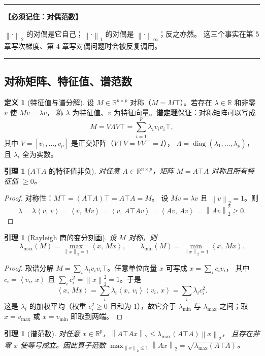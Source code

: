 \documentclass[11pt,a4paper,UTF8]{ctexart}
\theoremstyle{plain}
\newtheorem{lemma}[theorem]{引理}
\theoremstyle{definition}
\newtheorem{definition}[theorem]{定义}
\theoremstyle{remark}
\newcommand{\R}{\mathbb{R}}
\newcommand{\norm}[1]{\left\lVert #1 \right\rVert}
\newcommand{\inner}[2]{\left\langle #1,\, #2 \right\rangle}
\newcommand{\diag}{\operatorname{diag}}
\newenvironment{keypoint}[1]
  {\par\medskip\noindent\begin{minipage}{\linewidth}%
   \hrule\smallskip\noindent\textbf{【必须记住：#1】}\par\nopagebreak\smallskip}
  {\smallskip\hrule\end{minipage}\medskip}
\begin{document}
\begin{keypoint}{对偶范数}
$\norm{\cdot}_2$ 的对偶是它自己；$\norm{\cdot}_1$ 的对偶是 $\norm{\cdot}_\infty$；反之亦然。
这三个事实在第 5 章写次梯度、第 4 章写对偶问题时会被反复调用。
\end{keypoint}

\subsection{对称矩阵、特征值、谱范数}

\begin{definition}[特征值与谱分解]
设 $M\in\R^{p\times p}$ 对称（$M=M\top$）。若存在 $\lambda\in\R$ 和非零 $v$ 使 $Mv=\lambda v$，
称 $\lambda$ 为特征值、$v$ 为特征向量。\textbf{谱定理}保证：对称矩阵可以写成
\[
M=V\Lambda V\top=\sum_{i=1}^p\lambda_i v_iv_i\top,
\]
其中 $V=[v_1,\dots,v_p]$ 是正交矩阵（$V\top V=VV\top=I$），
$\Lambda=\diag(\lambda_1,\dots,\lambda_p)$，且 $\lambda_i$ 全为实数。
\end{definition}

\begin{lemma}[$A\top A$ 的特征值非负]\label{lem:psd}
对任意 $A\in\R^{n\times p}$，矩阵 $M=A\top A$ 对称且所有特征值 $\ge0$。
\end{lemma}

\begin{proof}
对称性：$M\top=(A\top A)\top=A\top A=M$。
设 $Mv=\lambda v$ 且 $\norm{v}_2=1$。则
\[
\lambda=\lambda\inner{v}{v}=\inner{v}{Mv}=\inner{v}{A\top Av}=\inner{Av}{Av}=\norm{Av}_2^2\ge0 .
\]
\end{proof}

\begin{lemma}[Rayleigh 商的变分刻画]\label{lem:rayleigh}
设 $M$ 对称，则
\[
\lambda_{\max}(M)=\max_{\norm{x}_2=1}\inner{x}{Mx},\qquad
\lambda_{\min}(M)=\min_{\norm{x}_2=1}\inner{x}{Mx}.
\]
\end{lemma}

\begin{proof}
取谱分解 $M=\sum_i\lambda_iv_iv_i\top$。任意单位向量 $x$ 可写成 $x=\sum_i c_iv_i$，
其中 $c_i=\inner{v_i}{x}$ 且 $\sum_ic_i^2=\norm{x}_2^2=1$。于是
\[
\inner{x}{Mx}=\sum_i\lambda_i\inner{x}{v_i}\inner{v_i}{x}=\sum_i\lambda_ic_i^2 .
\]
这是 $\lambda_i$ 的加权平均（权重 $c_i^2\ge0$ 且和为 $1$），故它介于 $\lambda_{\min}$ 与
$\lambda_{\max}$ 之间；取 $x=v_{\max}$ 或 $x=v_{\min}$ 即取到两端。
\end{proof}

\begin{lemma}[谱范数]\label{lem:specnorm}
对任意 $x\in\R^p$，$\norm{A\top Ax}_2\le\lambda_{\max}(A\top A)\norm{x}_2$，
且存在非零 $x$ 使等号成立。因此算子范数
$\max_{\norm{x}_2\le1}\norm{Ax}_2=\sqrt{\lambda_{\max}(A\top A)}$。
\end{lemma}
\end{document}
